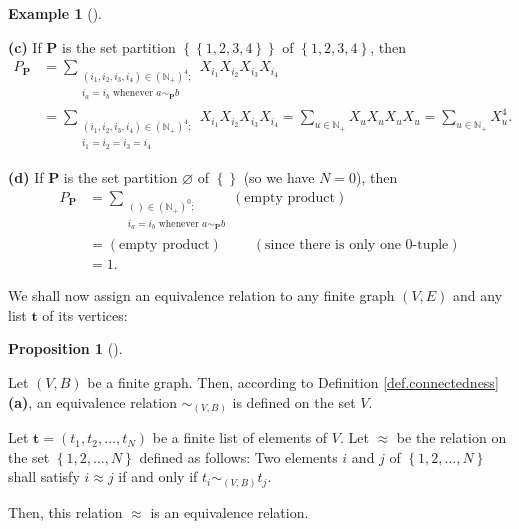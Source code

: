 \documentclass[numbers=enddot,12pt,final,onecolumn,notitlepage]{scrartcl}%
\theoremstyle{definition}
\newtheorem{prop}[theo]{Proposition}
\newenvironment{proposition}[1][]
{\begin{prop}[#1]\begin{leftbar}}
{\end{leftbar}\end{prop}}
\newtheorem{exmp}[theo]{Example}
\newenvironment{example}[1][]
{\begin{exmp}[#1]\begin{leftbar}}
{\end{leftbar}\end{exmp}}
\let\sumnonlimits\sum
\renewcommand{\sum}{\sumnonlimits\limits}
\begin{document}
\begin{example}
\textbf{(c)} If $\mathbf{P}$ is the set partition $\left\{  \left\{
1,2,3,4\right\}  \right\}  $ of $\left\{  1,2,3,4\right\}  $, then
\begin{align*}
P_{\mathbf{P}}  &  =\sum_{\substack{\left(  i_{1},i_{2},i_{3},i_{4}\right)
\in\left(  \mathbb{N}_{+}\right)  ^{4};\\i_{a}=i_{b}\text{ whenever }%
a\sim_{\mathbf{P}}b}}X_{i_{1}}X_{i_{2}}X_{i_{3}}X_{i_{4}}\\
&  =\sum_{\substack{\left(  i_{1},i_{2},i_{3},i_{4}\right)  \in\left(
\mathbb{N}_{+}\right)  ^{4};\\i_{1}=i_{2}=i_{3}=i_{4}}}X_{i_{1}}X_{i_{2}%
}X_{i_{3}}X_{i_{4}}=\sum_{u\in\mathbb{N}_{+}}X_{u}X_{u}X_{u}X_{u}=\sum
_{u\in\mathbb{N}_{+}}X_{u}^{4}.
\end{align*}


\textbf{(d)} If $\mathbf{P}$ is the set partition $\varnothing$ of $\left\{
{}\right\}  $ (so we have $N=0$), then%
\begin{align*}
P_{\mathbf{P}}  &  =\sum_{\substack{\left(  {}\right)  \in\left(
\mathbb{N}_{+}\right)  ^{0};\\i_{a}=i_{b}\text{ whenever }a\sim_{\mathbf{P}}%
b}}\left(  \text{empty product}\right) \\
&  =\left(  \text{empty product}\right)  \ \ \ \ \ \ \ \ \ \ \left(
\text{since there is only one }0\text{-tuple}\right) \\
&  =1.
\end{align*}

\end{example}

We shall now assign an equivalence relation to any finite graph $\left(
V,E\right)  $ and any list $\mathbf{t}$ of its vertices:

\begin{proposition}
\label{prop.graph-setpar}Let $\left(  V,B\right)  $ be a finite graph. Then,
according to Definition \ref{def.connectedness} \textbf{(a)}, an equivalence
relation $\sim_{\left(  V,B\right)  }$ is defined on the set $V$.

Let $\mathbf{t}=\left(  t_{1},t_{2},\ldots,t_{N}\right)  $ be a finite list of
elements of $V$. Let $\approx$ be the relation on the set $\left\{
1,2,\ldots,N\right\}  $ defined as follows: Two elements $i$ and $j$ of
$\left\{  1,2,\ldots,N\right\}  $ shall satisfy $i\approx j$ if and only if
$t_{i}\sim_{\left(  V,B\right)  }t_{j}$.

Then, this relation $\approx$ is an equivalence relation.
\end{proposition}
\end{document}

